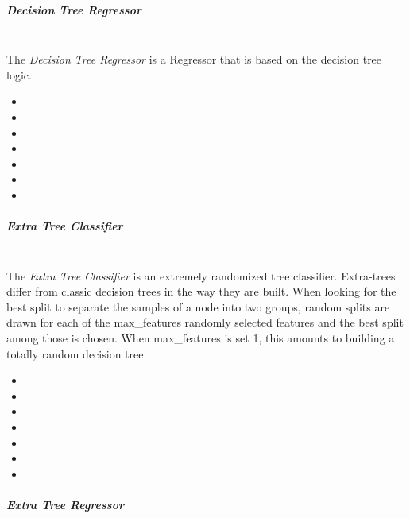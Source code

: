 \subparagraph{Decision Tree Regressor}
\mbox{}
\\The \textit{Decision Tree Regressor} is a Regressor that is based on the
decision tree logic.
%
\begin{itemize}
  \item {}
  \item {}
  \item {}
  \item {}
  \item {}
  \item {}
  \item {}
\end{itemize}

\subparagraph{Extra Tree Classifier}
\mbox{}
\\The \textit{Extra Tree Classifier} is an extremely randomized tree classifier.
%
Extra-trees differ from classic decision trees in the way they are built.
%
When looking for the best split to separate the samples of a node into two
groups, random splits are drawn for each of the max\_features randomly selected
features and the best split among those is chosen.
%
When max\_features is set 1, this amounts to building a totally random decision
tree.


\begin{itemize}
  \item {}
  \item {}
  \item {}
  \item {}
  \item {}
  \item {}
  \item {}
\end{itemize}

\subparagraph{Extra Tree Regressor}
\mbox{}

